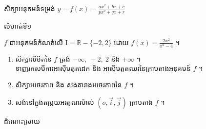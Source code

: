 \documentclass[expologarit]{subfiles}
\begin{document}
\begin{center}
\color{violet} \kml សិក្សាអនុគមន៍ទម្រង់ $y=f(x)=\frac{ax^2+bx+c}{px^2+qx+r}$
\end{center}
\begin{center}
\color{violet} {\kml លំហាត់ទី១}
\end{center}

 $f$ ជាអនុគមន៍កំណត់លើ $\mathrm{I}=\mathbb{R}-\{-2,2\}$ ដោយ $f(x)=\frac{2x^2}{x^2-4}$ ។
\begin{enumerate}[k]
\item សិក្សាលីមីតនៃ $f$ ត្រង់ $-\infty,\ -2,\ 2 $ និង $+\infty$ ។ \\
 ទាញរកសមីការអាស៊ីមតូតដេក និង អាស៊ីមតូតឈរនៃក្រាបតាងអនុគមន៍ $f$ ។
\item សិក្សាអថេរភាព និង សង់តារាងអថេរភាពនៃ $f$ ។
\item សង់នៅក្នុងតម្រុយអរតូណរម៉ាល់ $\left(o,\overrightarrow{i},\overrightarrow{j}\right)$ ក្រាបតាង $f$ ។
\end{enumerate}

\begin{center}
\color{violet} \kml ដំណោះស្រាយ
\end{center}
\end{document}
